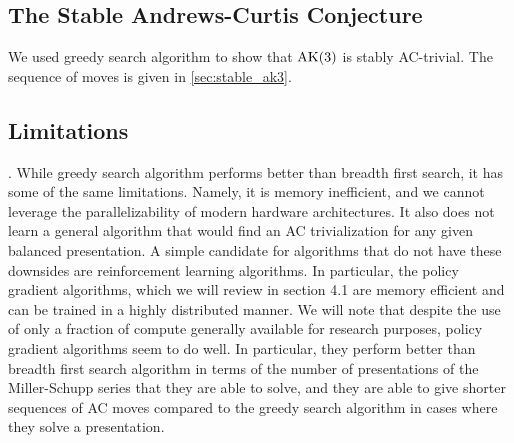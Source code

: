\subsection{The Stable Andrews-Curtis Conjecture}
We used greedy search algorithm to show that $\text{AK}(3)$ is stably AC-trivial. The sequence of moves is given in \autoref{sec:stable_ak3}.


\subsection{Limitations}. While greedy search algorithm performs better than breadth first search, it has some of the same limitations. Namely, it is memory inefficient, and we cannot leverage the parallelizability of modern hardware architectures. It also does not learn a general algorithm that would find an AC trivialization for any given balanced presentation. A simple candidate for algorithms that do not have these downsides are reinforcement learning algorithms. In particular, the policy gradient algorithms, which we will review in section 4.1 are memory efficient and can be trained in a highly distributed manner. We will note that despite the use of only a fraction of compute generally available for research purposes, policy gradient algorithms seem to do well. In particular, they perform better than breadth first search algorithm in terms of the number of presentations of the Miller-Schupp series that they are able to solve, and they are able to give shorter sequences of AC moves compared to the greedy search algorithm in cases where they solve a presentation. 
